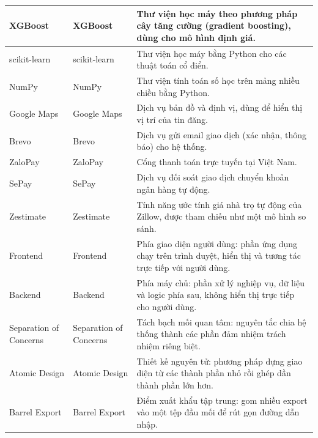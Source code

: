 \begin{longtable}{|L{0.18\textwidth}|L{0.27\textwidth}|L{0.49\textwidth}|}
XGBoost & XGBoost & Thư viện học máy theo phương pháp cây tăng cường (gradient boosting), dùng cho mô hình định giá. \\
\hline

scikit-learn & scikit-learn & Thư viện học máy bằng Python cho các thuật toán cổ điển. \\
\hline

NumPy & NumPy & Thư viện tính toán số học trên mảng nhiều chiều bằng Python. \\
\hline

Google Maps & Google Maps & Dịch vụ bản đồ và định vị, dùng để hiển thị vị trí của tin đăng. \\
\hline

Brevo & Brevo & Dịch vụ gửi email giao dịch (xác nhận, thông báo) cho hệ thống. \\
\hline

ZaloPay & ZaloPay & Cổng thanh toán trực tuyến tại Việt Nam. \\
\hline

SePay & SePay & Dịch vụ đối soát giao dịch chuyển khoản ngân hàng tự động. \\
\hline

Zestimate & Zestimate & Tính năng ước tính giá nhà trọ tự động của Zillow, được tham chiếu như một mô hình so sánh. \\
\hline

Frontend & Frontend & Phía giao diện người dùng: phần ứng dụng chạy trên trình duyệt, hiển thị và tương tác trực tiếp với người dùng. \\
\hline

Backend & Backend & Phía máy chủ: phần xử lý nghiệp vụ, dữ liệu và logic phía sau, không hiển thị trực tiếp cho người dùng. \\
\hline

Separation of Concerns & Separation of Concerns & Tách bạch mối quan tâm: nguyên tắc chia hệ thống thành các phần đảm nhiệm trách nhiệm riêng biệt. \\
\hline

Atomic Design & Atomic Design & Thiết kế nguyên tử: phương pháp dựng giao diện từ các thành phần nhỏ rồi ghép dần thành phần lớn hơn. \\
\hline

Barrel Export & Barrel Export & Điểm xuất khẩu tập trung: gom nhiều export vào một tệp đầu mối để rút gọn đường dẫn nhập. \\
\hline


\end{longtable}
